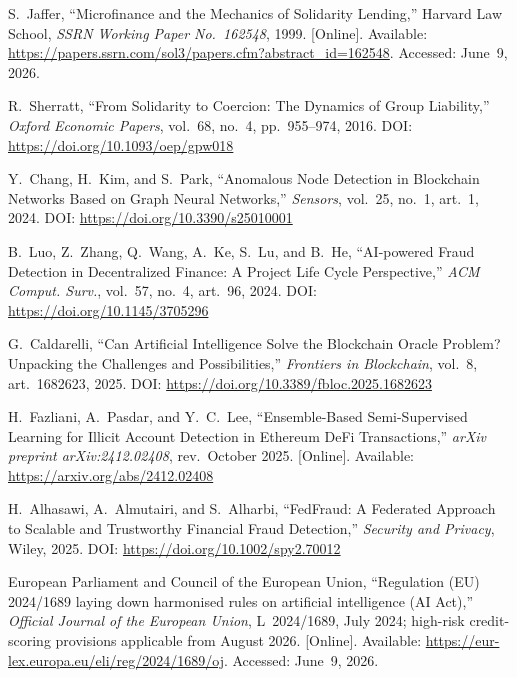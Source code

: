 \documentclass[12pt, a4paper]{report}
\begin{document}
{\begin{enumerate}[label={[\arabic*]}]
\item S.~Jaffer, ``Microfinance and the Mechanics of Solidarity Lending,'' Harvard Law School, \textit{SSRN Working Paper No.~162548}, 1999. [Online]. Available: \url{https://papers.ssrn.com/sol3/papers.cfm?abstract_id=162548}. Accessed: June~9, 2026.

\item R.~Sherratt, ``From Solidarity to Coercion: The Dynamics of Group Liability,'' \textit{Oxford Economic Papers}, vol.~68, no.~4, pp.~955--974, 2016. DOI: \url{https://doi.org/10.1093/oep/gpw018}

\item Y.~Chang, H.~Kim, and S.~Park, ``Anomalous Node Detection in Blockchain Networks Based on Graph Neural Networks,'' \textit{Sensors}, vol.~25, no.~1, art.~1, 2024. DOI: \url{https://doi.org/10.3390/s25010001}

\item B.~Luo, Z.~Zhang, Q.~Wang, A.~Ke, S.~Lu, and B.~He, ``AI-powered Fraud Detection in Decentralized Finance: A Project Life Cycle Perspective,'' \textit{ACM Comput. Surv.}, vol.~57, no.~4, art.~96, 2024. DOI: \url{https://doi.org/10.1145/3705296}

\item G.~Caldarelli, ``Can Artificial Intelligence Solve the Blockchain Oracle Problem? Unpacking the Challenges and Possibilities,'' \textit{Frontiers in Blockchain}, vol.~8, art.~1682623, 2025. DOI: \url{https://doi.org/10.3389/fbloc.2025.1682623}

\item H.~Fazliani, A.~Pasdar, and Y.~C.~Lee, ``Ensemble-Based Semi-Supervised Learning for Illicit Account Detection in Ethereum DeFi Transactions,'' \textit{arXiv preprint arXiv:2412.02408}, rev.~October 2025. [Online]. Available: \url{https://arxiv.org/abs/2412.02408}

\item H.~Alhasawi, A.~Almutairi, and S.~Alharbi, ``FedFraud: A Federated Approach to Scalable and Trustworthy Financial Fraud Detection,'' \textit{Security and Privacy}, Wiley, 2025. DOI: \url{https://doi.org/10.1002/spy2.70012}

\item European Parliament and Council of the European Union, ``Regulation (EU) 2024/1689 laying down harmonised rules on artificial intelligence (AI Act),'' \textit{Official Journal of the European Union}, L~2024/1689, July 2024; high-risk credit-scoring provisions applicable from August 2026. [Online]. Available: \url{https://eur-lex.europa.eu/eli/reg/2024/1689/oj}. Accessed: June~9, 2026.


\end{enumerate}}
\end{document}
